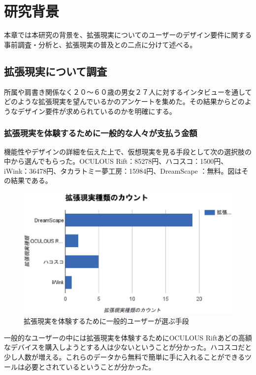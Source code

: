 \chapter{研究背景}
\label{chap:webapi}

本章では本研究の背景を、拡張現実についてのユーザーのデザイン要件に関する事前調査・分析と、拡張現実の普及との二点に分けて述べる。

\section{拡張現実について調査}
所属や肩書き関係なく２０〜６０歳の男女２７人に対するインタビューを通してどのような拡張現実を望んでいるかのアンケートを集めた。その結果からどのようなデザイン要件が求められているのかを明確にする。

\subsection{拡張現実を体験するために一般的な人々が支払う金額}
機能性やデザインの詳細を伝えた上で、仮想現実を見る手段として次の選択肢の中から選んでもらった。OCULOUS Rift：85278円、ハコスコ：1500円、iWink：36478円、タカラトミー夢工房：15984円、DreamScape ：無料。図はその結果である。

\begin{figure}[htbp]
\begin{center}
\includegraphics[width=15cm]{eps/VRselection.eps}
\caption{拡張現実を体験するために一般的ユーザーが選ぶ手段}
\label{拡張現実を体験するために一般的ユーザーが選ぶ手段}
\end{center}
\end{figure}

一般的なユーザーの中には拡張現実を体験するためにOCULOUS Riftあどの高額なデバイスを購入しようとする人は少ないということが分かった。ハコスコだと少し人数が増える。これらのデータから無料で簡単に手に入れることができるツールは必要とされているということが分かった。

